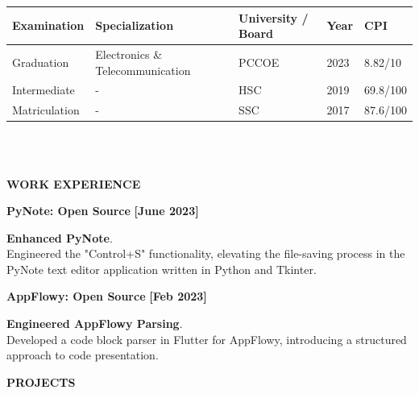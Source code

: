 \documentclass[a4paper,10pt]{article}
\begin{document}
\vspace{-.8cm}

\begin{tabularx}{.98\textwidth}{llp{2cm}lll}
  \hline
  \textbf{Examination} & \textbf{Specialization}          &  & \textbf{University / Board} & \textbf{Year} & \textbf{CPI} \\
  \hline
  Graduation           & Electronics \& Telecommunication &  & PCCOE                       & 2023          & 8.82/10      \\
  Intermediate         & -                                &  & HSC                         & 2019          & 69.8/100     \\
  Matriculation        & -                                &  & SSC                         & 2017          & 87.6/100     \\
  \hline
\end{tabularx}
\\\\

\colorbox{titleColor}{\parbox{6.7in}{\textbf{WORK EXPERIENCE}}}

\begin{itemize*}
  \setlength{\itemsep}{.00pt}
  \item \textbf{{PyNote: Open Source}} \hfill {\small{{\textbf{[June 2023]}}\/}}
  \begin{itemize*}
    \item \textbf{Enhanced PyNote}.\\
    Engineered the "Control+S" functionality, elevating the file-saving process in the PyNote text editor application written in Python and Tkinter.
  \end{itemize*}
\end{itemize*}

\begin{itemize*}
  \setlength{\itemsep}{.00pt}
  \item \textbf{{AppFlowy: Open Source}} \hfill {\small{{\textbf{[Feb 2023]}}\/}}
  \begin{itemize*}
    \item \textbf{Engineered AppFlowy Parsing}.\\
    Developed a code block parser in Flutter for AppFlowy, introducing a structured approach to code presentation.
  \end{itemize*}
\end{itemize*}

\colorbox{titleColor}{\parbox{6.7in}{\textbf{ PROJECTS}}}
\end{document}
